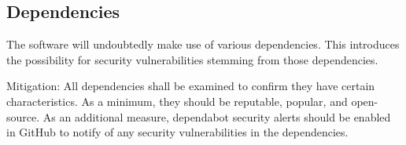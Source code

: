 \documentclass[12pt, letterpaper]{article}
\begin{document}
\subsection{Dependencies}

The software will undoubtedly make use of various dependencies. This introduces the possibility for security vulnerabilities stemming from those dependencies.

Mitigation: All dependencies shall be examined to confirm they have certain characteristics. As a minimum, they should be reputable, popular, and open-source. As an additional measure, dependabot security alerts should be enabled in GitHub to notify of any security vulnerabilities in the dependencies.
\end{document}
